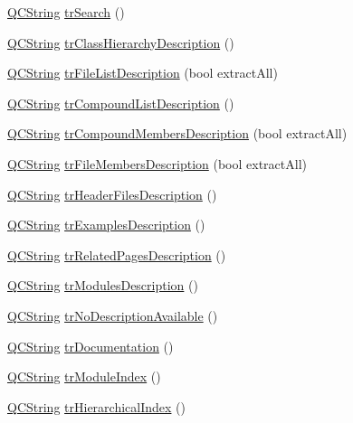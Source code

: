 \begin{DoxyCompactItemize}
\hyperlink{class_q_c_string}{Q\-C\-String} \hyperlink{class_translator_polish_a2f2c099d338acd273fcee72f364cb0bf}{tr\-Search} ()
\item 
\hyperlink{class_q_c_string}{Q\-C\-String} \hyperlink{class_translator_polish_af186dceea08383c80ad071e6e3f543ba}{tr\-Class\-Hierarchy\-Description} ()
\item 
\hyperlink{class_q_c_string}{Q\-C\-String} \hyperlink{class_translator_polish_a06622611a5482a239a3ceb1c3fad6fce}{tr\-File\-List\-Description} (bool extract\-All)
\item 
\hyperlink{class_q_c_string}{Q\-C\-String} \hyperlink{class_translator_polish_a18f7b164eb6009520c23d8af21d01567}{tr\-Compound\-List\-Description} ()
\item 
\hyperlink{class_q_c_string}{Q\-C\-String} \hyperlink{class_translator_polish_afba045a538c6b4cff7756d4435702631}{tr\-Compound\-Members\-Description} (bool extract\-All)
\item 
\hyperlink{class_q_c_string}{Q\-C\-String} \hyperlink{class_translator_polish_ad17c74cbe2208cab62912d3f2e99c351}{tr\-File\-Members\-Description} (bool extract\-All)
\item 
\hyperlink{class_q_c_string}{Q\-C\-String} \hyperlink{class_translator_polish_af774d399513e09101914756c514a81d1}{tr\-Header\-Files\-Description} ()
\item 
\hyperlink{class_q_c_string}{Q\-C\-String} \hyperlink{class_translator_polish_a11dd83f87e1d6ba0a6c2ef418d9ccb11}{tr\-Examples\-Description} ()
\item 
\hyperlink{class_q_c_string}{Q\-C\-String} \hyperlink{class_translator_polish_a4e97a46b23f0e534aa73cf4c02aebe3c}{tr\-Related\-Pages\-Description} ()
\item 
\hyperlink{class_q_c_string}{Q\-C\-String} \hyperlink{class_translator_polish_a5cc376e4e57f8791fa6b95f8275b5ed6}{tr\-Modules\-Description} ()
\item 
\hyperlink{class_q_c_string}{Q\-C\-String} \hyperlink{class_translator_polish_a140de920025c759665fab4ecfeeb804f}{tr\-No\-Description\-Available} ()
\item 
\hyperlink{class_q_c_string}{Q\-C\-String} \hyperlink{class_translator_polish_aae6547fd48c2b7a62503ef2466977c6f}{tr\-Documentation} ()
\item 
\hyperlink{class_q_c_string}{Q\-C\-String} \hyperlink{class_translator_polish_a632bc39ac817c83b74c16e63d375979b}{tr\-Module\-Index} ()
\item 
\hyperlink{class_q_c_string}{Q\-C\-String} \hyperlink{class_translator_polish_a0e0aeba35a42bb63680e044cf8c48310}{tr\-Hierarchical\-Index} ()

\end{DoxyCompactItemize}
